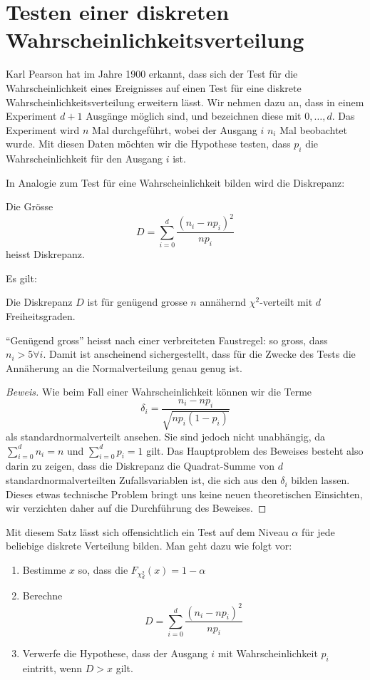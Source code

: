 \section{Testen einer diskreten Wahrscheinlichkeitsverteilung}
\label{section-testen-diskreter-wkeitsverteilung}
Karl Pearson hat im Jahre 1900 erkannt, dass sich der Test für die
Wahrscheinlichkeit eines Ereignisses auf einen Test für eine
diskrete Wahrscheinlichkeitsverteilung erweitern lässt.
Wir nehmen
dazu an, dass in einem Experiment $d+1$ Ausgänge möglich sind, und
bezeichnen diese mit $0,\dots,d$.
Das Experiment wird $n$ Mal
durchgeführt, wobei der Ausgang $i$ $n_i$ Mal beobachtet wurde.
Mit diesen Daten möchten wir die Hypothese testen, dass $p_i$ die
Wahrscheinlichkeit für den Ausgang $i$ ist.

In Analogie zum Test für eine Wahrscheinlichkeit bilden wird die
Diskrepanz:
\begin{definition}Die Grösse
\begin{equation}
D=\sum_{i=0}^d\frac{(n_i-np_i)^2}{np_i} \label{formel-diskrepanz}
\end{equation}
heisst Diskrepanz.
\end{definition}
Es gilt:
\begin{satz}[Pearson] Die Diskrepanz $D$ ist für genügend grosse
$n$ annähernd $\chi^2$-verteilt mit $d$ Freiheitsgraden.
\end{satz}
``Genügend gross'' heisst nach einer verbreiteten Faustregel: so
gross, dass $n_i>5\forall i$.
Damit ist anscheinend sichergestellt,
dass für die Zwecke des Tests die Annäherung an die Normalverteilung
genau genug ist.
\begin{proof}[Beweis]
Wie beim Fall einer Wahrscheinlichkeit können wir die Terme
\[
\delta_i=\frac{n_i-np_i}{\sqrt{np_i(1-p_i)}}
\]
als standardnormalverteilt ansehen.
Sie sind jedoch nicht
unabhängig, da $\sum_{i=0}^d n_i=n$ und $\sum_{i=0}^dp_i=1$
gilt.
Das Hauptproblem des Beweises besteht also darin zu zeigen,
dass die Diskrepanz die Quadrat-Summe von $d$ standardnormalverteilten
Zufallsvariablen ist, die sich aus den $\delta_i$ bilden lassen.
Dieses etwas technische Problem bringt uns keine neuen theoretischen
Einsichten, wir verzichten daher auf die Durchführung des Beweises.
\end{proof}

Mit diesem Satz lässt sich offensichtlich ein Test auf dem Niveau
$\alpha$ für jede
beliebige diskrete Verteilung bilden.
Man geht dazu wie folgt vor:
\begin{enumerate}
\item Bestimme $x$ so, dass die $F_{\chi_{d}^2}(x)=1-\alpha$
\item Berechne 
\[
D=\sum_{i=0}^d\frac{(n_i-np_i)^2}{np_i}
\]
\item Verwerfe die Hypothese, dass der Ausgang $i$ mit Wahrscheinlichkeit
$p_i$ eintritt, wenn $D>x$ gilt.
\end{enumerate}

